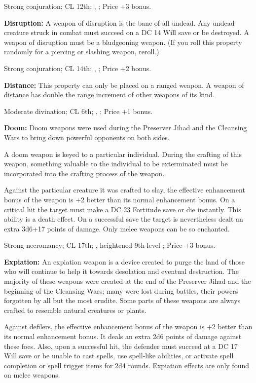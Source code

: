 Strong conjuration; CL 12th; , ; Price +3 bonus.


\textbf{Disruption:} A weapon of disruption is the bane of all undead. Any undead creature struck in combat must succeed on a DC 14 Will save or be destroyed. A weapon of disruption must be a bludgeoning weapon. (If you roll this property randomly for a piercing or slashing weapon, reroll.)

Strong conjuration; CL 14th; , ; Price +2 bonus.


\textbf{Distance:} This property can only be placed on a ranged weapon. A weapon of distance has double the range increment of other weapons of its kind.

Moderate divination; CL 6th; , ; Price +1 bonus.


\textbf{Doom:} Doom weapons were used during the Preserver Jihad and the Cleansing Wars to bring down powerful opponents on both sides.

A doom weapon is keyed to a particular individual. During the crafting of this weapon, something valuable to the individual to be exterminated must be incorporated into the crafting process of the weapon.

Against the particular creature it was crafted to slay, the effective enhancement bonus of the weapon is +2 better than its normal enhancement bonus. On a critical hit the target must make a DC 23 Fortitude save or die instantly. This ability is a death effect. On a successful save the target is nevertheless dealt an extra 3d6+17 points of damage. Only melee weapons can be so enchanted.

Strong necromancy; CL 17th; , heightened 9th-level ; Price +3 bonus.


\textbf{Expiation:} An expiation weapon is a device created to purge the land of those who will continue to help it towards desolation and eventual destruction. The majority of these weapons were created at the end of the Preserver Jihad and the beginning of the Cleansing Wars; many were lost during battles, their powers forgotten by all but the most erudite. Some parts of these weapons are always crafted to resemble natural creatures or plants.

Against defilers, the effective enhancement bonus of the weapon is +2 better than its normal enhancement bonus. It deals an extra 2d6 points of damage against these foes. Also, upon a successful hit, the defender must succeed at a DC 17 Will save or be unable to cast spells, use spell-like abilities, or activate spell completion or spell trigger items for 2d4 rounds. Expiation effects are only found on melee weapons.

